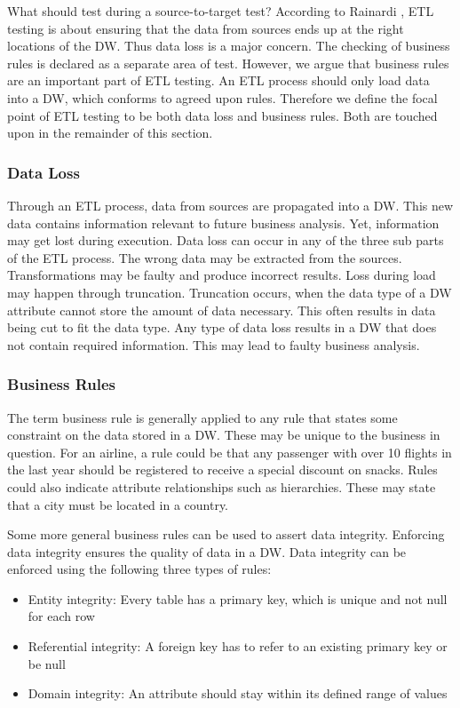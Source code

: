 What should \FW{} test during a source-to-target test? According to Rainardi \cite{rainardi2007building}, ETL testing is about ensuring that the data from sources ends up at the right locations of the DW. Thus data loss is a major concern. The checking of business rules is declared as a separate area of test. However, we argue that business rules are an important part of ETL testing. An ETL process should only load data into a DW, which conforms to agreed upon rules. Therefore we define the focal point of ETL testing to be both data loss and business rules. Both are touched upon in the remainder of this section.

\subsubsection{Data Loss}
Through an ETL process, data from sources are propagated into a DW. This new data contains information relevant to future business analysis. Yet, information may get lost during execution. Data loss can occur in any of the three sub parts of the ETL process. The wrong data may be extracted from the sources. Transformations may be faulty and produce incorrect results. Loss during load may happen through truncation. Truncation occurs, when the data type of a DW attribute cannot store the amount of data necessary. This often results in data being cut to fit the data type. Any type of data loss results in a DW that does not contain required information. This may lead to faulty business analysis.

\subsubsection{Business Rules}
The term business rule is generally applied to any rule that states some constraint on the data stored in a DW. These may be unique to the business in question. For an airline, a rule could be that any passenger with over 10 flights in the last year should be registered to receive a special discount on snacks. Rules could also indicate attribute relationships such as hierarchies. These may state that a city must be located in a country.

Some more general business rules can be used to assert data integrity. Enforcing data integrity ensures the quality of data in a DW. Data integrity can be enforced using the following three types of rules:

\begin{itemize}
\item Entity integrity: Every table has a primary key, which is unique and not null for each row
\item Referential integrity: A foreign key has to refer to an existing primary key or be null
\item Domain integrity: An attribute should stay within its defined range of values
\end{itemize}

